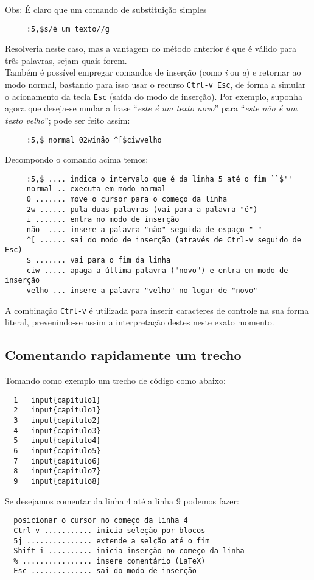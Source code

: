 Obs: É claro que um comando de substituição simples

\begin{verbatim}
     :5,$s/é um texto//g
\end{verbatim}

Resolveria neste caso, mas a vantagem do método anterior é que
é válido para três palavras, sejam quais forem.\\

Também é possível empregar comandos de inserção (como {\em i} ou {\em a}) e
retornar ao modo normal, bastando para isso usar o recurso \verb|Ctrl-v Esc|,
de forma a simular o acionamento da tecla \verb|Esc| (saída do modo de
inserção). Por exemplo, suponha agora que deseja-se mudar a frase ``{\em este
é um texto novo}'' para ``{\em este não é um texto velho}''; pode ser feito
assim:

\begin{verbatim}
     :5,$ normal 02winão ^[$ciwvelho
\end{verbatim}

Decompondo o comando acima temos:

\begin{verbatim}
     :5,$ .... indica o intervalo que é da linha 5 até o fim ``$''
     normal .. executa em modo normal
     0 ....... move o cursor para o começo da linha
     2w ...... pula duas palavras (vai para a palavra "é")
     i ....... entra no modo de inserção
     não  .... insere a palavra "não" seguida de espaço " "
     ^[ ...... sai do modo de inserção (através de Ctrl-v seguido de Esc)
     $ ....... vai para o fim da linha
     ciw ..... apaga a última palavra ("novo") e entra em modo de inserção
     velho ... insere a palavra "velho" no lugar de "novo"
\end{verbatim}

A combinação \verb|Ctrl-v| é utilizada para inserir caracteres de controle na
sua forma literal, prevenindo-se assim a interpretação destes neste exato
momento.

\subsection{Comentando rapidamente um trecho}

Tomando como exemplo um trecho de código como abaixo:

\begin{verbatim}
  1   input{capitulo1}
  2   input{capitulo1}
  3   input{capitulo2}
  4   input{capitulo3}
  5   input{capitulo4}
  6   input{capitulo5}
  7   input{capitulo6}
  8   input{capitulo7}
  9   input{capitulo8}
\end{verbatim}

Se desejamos comentar da linha 4 até a linha 9 podemos fazer:

\begin{verbatim}
  posicionar o cursor no começo da linha 4
  Ctrl-v ........... inicia seleção por blocos
  5j ............... extende a selção até o fim
  Shift-i .......... inicia inserção no começo da linha
  % ................ insere comentário (LaTeX)
  Esc .............. sai do modo de inserção
\end{verbatim}


